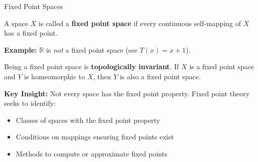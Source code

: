 \documentclass[aspectratio=169,10pt]{beamer}
\begin{document}
\begin{frame}{Fixed Point Spaces}
    \begin{definition}
        A space $X$ is called a \textbf{fixed point space} if every continuous self-mapping of $X$ has a fixed point.
    \end{definition}

    \vspace{0.5cm}
    \textbf{Example:} $\mathbb{R}$ is \textit{not} a fixed point space (see $T(x) = x + 1$).

    \vspace{0.3cm}
    \begin{observation}
        Being a fixed point space is \textbf{topologically invariant}. If $X$ is a fixed point space and $Y$ is homeomorphic to $X$, then $Y$ is also a fixed point space.
    \end{observation}

    \vspace{0.5cm}
    \textbf{Key Insight:} Not every space has the fixed point property. Fixed point theory seeks to identify:
    \begin{itemize}
        \item Classes of spaces with the fixed point property
        \item Conditions on mappings ensuring fixed points exist
        \item Methods to compute or approximate fixed points
    \end{itemize}
\end{frame}
\end{document}
